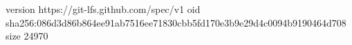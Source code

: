 version https://git-lfs.github.com/spec/v1
oid sha256:086d3d86b864ee91ab7516ee71830cbb5fd170e3b9e29d4c0094b9190464d708
size 24970
